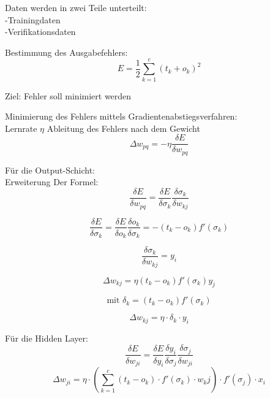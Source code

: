  Daten werden in zwei Teile unterteilt:
 \\-Trainingdaten
 \\-Verifikationsdaten
 
 
 Bestimmung des Ausgabefehlers:
\begin{equation}
E = \frac{1}{2} \sum_{k=1}^{c}(t_{k}+o_{k})^2
\end{equation}

Ziel: Fehler soll minimiert werden

Minimierung des Fehlers mittels Gradientenabstiegsverfahren:
\\Lernrate $\eta$
Ableitung des Fehlers nach dem Gewicht
\begin{equation}
\Delta w_{pq}=-\eta \frac{\delta E}{\delta w_{pq}}
\end{equation}

Für die Output-Schicht:
\\Erweiterung Der Formel:
\begin{equation}
\frac{\delta E}{\delta w_{pq}} = \frac{\delta E}{\delta \sigma_{k}} \frac{\delta \sigma_{k}}{\delta w_{kj}}
\end{equation}

\begin{equation}
\frac{\delta E}{\delta \sigma_{k}} = \frac{\delta E}{\delta o_{k}} \frac{\delta o_k}{\delta \sigma_k} = -(t_k - o_k) f'(\sigma_k)
\end{equation}

\begin{equation}
\frac{\delta\sigma_k}{\delta w_{kj}}=y_i
\end{equation}

\begin{equation}
\Delta w_{kj} = \eta (t_k - o_k) f'(\sigma_k)y_j
\end{equation}

\begin{equation}
\mbox{mit }\delta_k = (t_k - o_k) f'(\sigma_k)
\end{equation}

\begin{equation}
\Delta w_{kj} = \eta\cdot \delta_k \cdot y_i
\end{equation}

Für die Hidden Layer:
\begin{equation}
\frac{\delta E}{\delta w_{ji}} = \frac{\delta E}{\delta y_i} \frac{\delta y_i}{\delta\sigma_j}\frac{\delta\sigma_j}{\delta w_{ji}}
\end{equation}
\begin{equation}
\Delta w_{ji} = \eta \cdot (\sum_{k=1}^{c}(t_k-o_k)\cdot f'(\sigma_k)\cdot w_kj) \cdot f'(\sigma_j) \cdot x_i
\end{equation}

